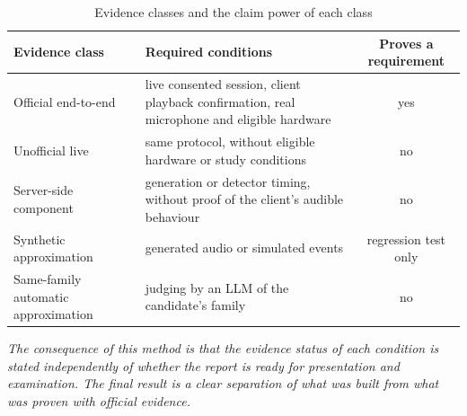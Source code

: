 \begin{table}[ht]
\centering
\caption{Evidence classes and the claim power of each class}
\label{tab:evidence-classes}
\small
\begin{tabular}{L{3.6cm}L{6.0cm}c}
\toprule
\textbf{Evidence class} & \textbf{Required conditions} & \textbf{Proves a requirement} \\
\midrule
Official end-to-end & live consented session, client playback
confirmation, real microphone and eligible hardware & yes \\
Unofficial live & same protocol, without eligible hardware or study conditions &
no \\
Server-side component & generation or detector timing, without proof of the
client's audible behaviour & no \\
Synthetic approximation & generated audio or simulated events & regression test only \\
Same-family automatic approximation & judging by an LLM of the candidate's
family & no \\
\bottomrule
\end{tabular}

\vspace{0.5em}
{\footnotesize\itshape The consequence of this method is that the evidence
status of each condition is stated independently of whether the report is ready
for presentation and examination. The final result is a clear separation of what
was built from what was proven with official evidence.\par}
\end{table}
